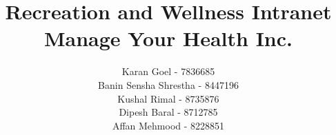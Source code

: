\documentclass[master]{project_report}
\title{
    Recreation and Wellness Intranet \\
    Manage Your Health Inc.
}
\author{
    Karan Goel - 7836685 \\
    Banin Sensha Shrestha - 8447196 \\ 
    Kushal Rimal - 8735876 \\ 
    Dipesh Baral - 8712785 \\ 
    Affan Mehmood - 8228851 
}
\begin{document}
\frontmatter



\makeatletter
\renewcommand{\@chapapp}{Part}
\makeatother

\mainmatter










\end{document}
